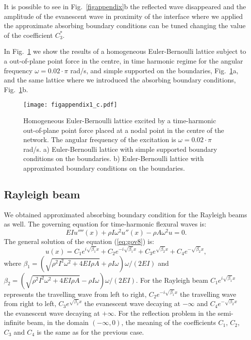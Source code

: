 \documentclass[11pt]{article}
\begin{document}
It is possible to see in Fig.~\ref{figappendix}b the reflected wave disappeared and the amplitude of the evanescent wave in proximity of the interface where we applied the approximate absorbing boundary conditions can be tuned changing the value of the coefficient $C_3^*$.

In Fig.~\ref{figappendix1} we show the results of a homogeneous Euler-Bernoulli lattice subject to a out-of-plane point force in the centre, in time harmonic regime for the angular frequency $\omega=0.02\!\cdot\!\pi$ rad/s, and simple supported on the boundaries, Fig.~\ref{figappendix1}a, and the same lattice where we introduced the absorbing boundary conditions, Fig.~\ref{figappendix1}b.

\clearpage

\begin{figure}[!htb]
\centering
\texttt{[image: figappendix1\_c.pdf]}
\caption{\footnotesize Homogeneous Euler-Bernoulli lattice excited by a time-harmonic out-of-plane point force placed at a nodal point in the centre of the network. The angular frequency of the excitation is $\omega=0.02\!\cdot\!\pi$ rad/s. a) Euler-Bernoulli lattice with simple supported boundary conditions on the boundaries. b) Euler-Bernoulli lattice with approximated boundary conditions on the boundaries.}
\label{figappendix1}
\end{figure}


\subsection{Rayleigh beam}

We obtained approximated absorbing boundary condition for the Rayleigh beams as well. The governing equation for time-harmonic flexural waves is:
%
\begin{equation}
\label{eq:gov8}
EI u''''(x)+\rho I \omega^2 u''(x)-\rho A \omega^2 u = 0.
\end{equation}
%
The general solution of the equation (\ref{eq:gov8}) is:
%
\begin{equation}
\label{eq:gov9}
u(x)=C_1e^{i\sqrt{\beta_1}x}+C_2e^{-i\sqrt{\beta_1}x}+C_3e^{\sqrt{\beta_2}x}+C_4e^{-\sqrt{\beta_2}x},
\end{equation}
%
where $\beta_1=(\sqrt{\rho^2I^2\omega^2+4EI\rho A}+\rho I\omega)\omega/(2 EI)$ and $\beta_2=(\sqrt{\rho^2I^2\omega^2+4EI\rho A}-\rho I\omega)\omega/(2 EI)$. For the Rayleigh beam $C_1e^{i\sqrt{\beta_1}x}$ represents the travelling wave from left to right, $C_2e^{-i\sqrt{\beta_1}x}$ the travelling wave from right to left, $C_3e^{\sqrt{\beta_2}x}$ the evanescent wave decaying at $-\infty$ and $C_4e^{-\sqrt{\beta_2}x}$ the evanescent wave decaying at $+\infty$. For the reflection problem in the semi-infinite beam, in the domain $(-\infty,0)$, the meaning of the coefficients $C_1$, $C_2$, $C_3$ and $C_4$ is the same as for the previous case.
\end{document}
